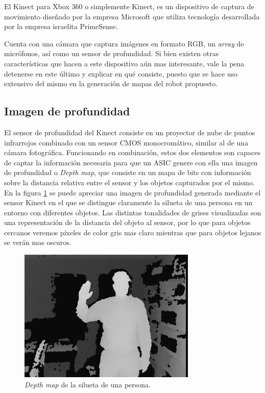 El Kinect para Xbox 360 o simplemente Kinect, es un dispositivo de captura de movimiento diseñado por la empresa Microsoft que utiliza tecnología desarrollada por la empresa israelita PrimeSense.

Cuenta con una cámara que captura imágenes en formato RGB, un \textit{array} de micrófonos, así como un sensor de profundidad. Si bien existen otras características que hacen a este dispositivo aún mas interesante, vale la pena detenerse en este último y explicar en qué consiste, puesto que se hace uso extensivo del mismo en la generación de mapas del robot propuesto.

\subsection{Imagen de profundidad}

El sensor de profundidad del Kinect consiste en un proyector de nube de puntos infrarrojos combinado con un sensor CMOS monocromático, similar al de una cámara fotográfica. Funcionando en combinación, estos dos elementos son capaces de captar la información necesaria para que un ASIC genere con ella una imagen de profundidad o \textit{Depth map}, que consiste en un mapa de bits con información sobre la distancia relativa entre el sensor y los objetos capturados por el mismo. En la figura \ref{fig:depthMap} se puede apreciar una imagen de profundidad generada mediante el sensor Kinect en el que se distingue claramente la silueta de una persona en un entorno con diferentes objetos. Las distintas tonalidades de grises visualizadas son una representación de la distancia del objeto al sensor, por lo que para objetos cercanos veremos píxeles de color gris mas claro mientras que para objetos lejanos se verán mas oscuros.

\begin{figure}[ht]
    \centering
    \includegraphics[scale=2.0]{./Figures/depth_map.png}
    \caption{\textit{Depth map} de la silueta de una persona.}
    \label{fig:depthMap}
\end{figure}

